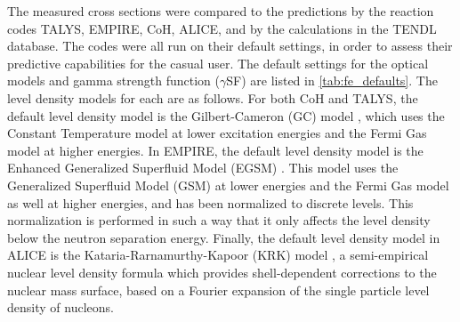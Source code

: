 The measured cross sections were compared to the predictions by the reaction codes TALYS, EMPIRE, CoH, ALICE, and by the calculations in the TENDL database.
The codes were all run on their default settings, in order to assess their predictive capabilities for the casual user.
The default settings for the optical models and gamma strength function ($\gamma$SF) are listed in  \autoref{tab:fe_defaults}.
The level density models for each are as follows.
For both CoH and TALYS, the default level density model is the Gilbert-Cameron (GC) model \cite{Gilbert2011}, which uses the Constant Temperature model at lower excitation energies and the Fermi Gas model at higher energies.
In EMPIRE, the default level density model is the Enhanced Generalized Superfluid Model (EGSM) \cite{Giardina2002}.
This model uses the Generalized Superfluid Model (GSM) \cite{ignatyuk1979role,Ignatyuk1993} at lower energies and the Fermi Gas model as well at higher energies, and has been normalized to discrete levels.
This normalization is performed in such a way that it only affects the level density below the neutron separation energy.
Finally, the default level density model in ALICE is the Kataria-Rarnamurthy-Kapoor (KRK) model \cite{Kataria1978,Kataria1990}, a semi-empirical nuclear level density formula which provides shell-dependent corrections to the nuclear mass surface, based on a Fourier expansion of the single particle level density of nucleons.

